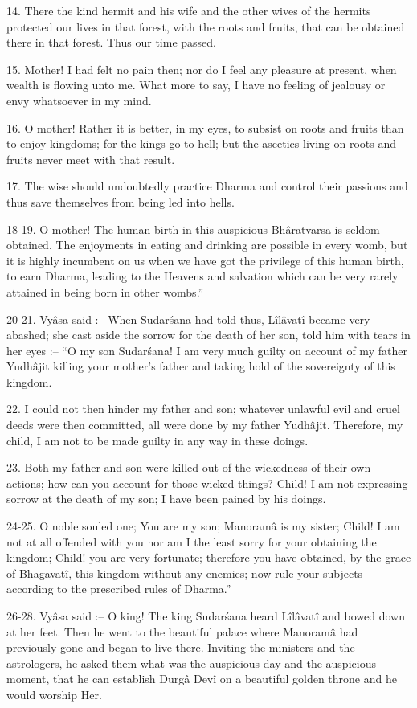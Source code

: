 14. There the kind hermit and his wife and the other wives of the hermits protected our lives in that forest, with the roots and fruits, that can be obtained there in that forest. Thus our time passed.

15. Mother! I had felt no pain then; nor do I feel any pleasure at present, when wealth is flowing unto me. What more to say, I have no feeling of jealousy or envy whatsoever in my mind.

16. O mother! Rather it is better, in my eyes, to subsist on roots and fruits than to enjoy kingdoms; for the kings go to hell; but the ascetics living on roots and fruits never meet with that result.

17. The wise should undoubtedly practice Dharma and control their passions and thus save themselves from being led into hells.

18-19. O mother! The human birth in this auspicious Bh\^aratvarsa is seldom obtained. The enjoyments in eating and drinking are possible in every womb, but it is highly incumbent on us when we have got the privilege of this human birth, to earn Dharma, leading to the Heavens and salvation which can be very rarely attained in being born in other wombs.''

20-21. Vy\^asa said :-- When Sudar\'sana had told thus, L\^il\^avat\^i became very abashed; she cast aside the sorrow for the death of her son, told him with tears in her eyes :-- ``O my son Sudar\'sana! I am very much guilty on account of my father Yudh\^ajit killing your mother's father and taking hold of the sovereignty of this kingdom.

22. I could not then hinder my father and son; whatever unlawful evil and cruel deeds were then committed, all were done by my father Yudh\^ajit. Therefore, my child, I am not to be made guilty in any way in these doings.

23. Both my father and son were killed out of the wickedness of their own actions; how can you account for those wicked things? Child! I am not expressing sorrow at the death of my son; I have been pained by his doings.

24-25. O noble souled one; You are my son; Manoram\^a is my sister; Child! I am not at all offended with you nor am I the least sorry for your obtaining the kingdom; Child! you are very fortunate; therefore you have obtained, by the grace of Bhagavat\^i, this kingdom without any enemies; now rule your subjects according to the prescribed rules of Dharma.''

26-28. Vy\^asa said :-- O king! The king Sudar\'sana heard L\^il\^avat\^i and bowed down at her feet. Then he went to the beautiful palace where Manoram\^a had previously gone and began to live there. Inviting the ministers and the astrologers, he asked them what was the auspicious day and the auspicious moment, that he can establish Durg\^a Dev\^i on a beautiful golden throne and he would worship Her.

